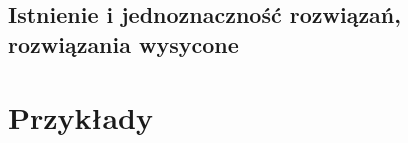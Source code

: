 \documentclass{mwart}
\begin{document}
    \subsection{Istnienie i jednoznaczność rozwiązań, rozwiązania wysycone}
      
  
  \section{Przykłady}
\end{document}
